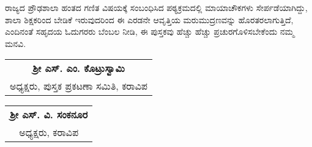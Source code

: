 ರಾಜ್ಯದ ಪ್ರೌಢಶಾಲಾ ಹಂತದ ಗಣಿತ ವಿಷಯಕ್ಕೆ ಸಂಬಂಧಿಸಿದ ಪಠ್ಯಕ್ರಮದಲ್ಲಿ ಮಾಯಾ\-ಚೌಕಗಳು ಸೇರ್ಪಡೆಯಾಗಿದ್ದು, ಶಾಲಾ ಶಿಕ್ಷಕರಿಂದ ಬೇಡಿಕೆ ಇರುವುದರಿಂದ ಈ ಎರಡನೇ ಆವೃತ್ತಿಯ ಮರುಮುದ್ರಣವನ್ನು ಹೊರತರಲಾಗುತ್ತಿದೆ, ಎಂದಿನಂತೆ ಸಹೃದಯ ಓದುಗರರು ಬೆಂಬಲ ನೀಡಿ, ಈ ಪುಸ್ತಕವು ಹೆಚ್ಚು ಹೆಚ್ಚು ಪ್ರಚುರಗೊಳಿಸಬೇಕೆಂದು ನಮ್ಮ ಮನವಿ.

\medskip

\noindent
\begin{tabular}{c}
{\bf ಶ್ರೀ ಎಸ್. ಎಂ. ಕೊಟ್ರುಸ್ವಾಮಿ }\\
ಅಧ್ಯಕ್ಷರು, ಪುಸ್ತಕ ಪ್ರಕಟಣಾ ಸಮಿತಿ, ಕರಾವಿಪ
\end{tabular}
\begin{flushright}
\begin{tabular}{c}
{\bf ಶ್ರೀ ಎಸ್. ವಿ. ಸಂಕನೂರ}\\
ಅಧ್ಯಕ್ಷರು, ಕರಾವಿಪ
\end{tabular}
\end{flushright}

\newpage
